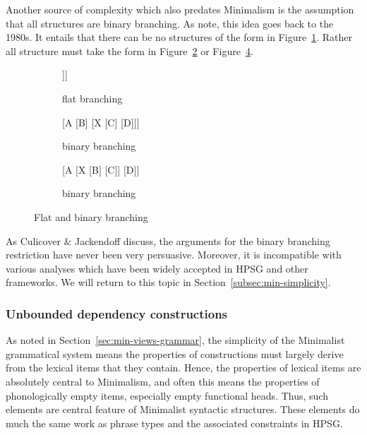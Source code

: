 \documentclass[output=paper
                ,modfonts
                ,nonflat
	        ,collection
	        ,collectionchapter
	        ,collectiontoclongg
 	        ,biblatex
                ,babelshorthands
                ,newtxmath
                ,draftmode
                ,colorlinks, citecolor=brown
]{./langsci/langscibook}
\begin{document}
Another source of complexity which also predates Minimalism is the assumption that
all structures are binary branching. As  \citet[112--116]{CJ2005a} note, this idea goes back to the
1980s. It entails that there can be no structures of the form in
Figure~\ref{fig:min-trinary}. Rather all structure must take the form in
Figure~\ref{fig:min-binary-a} or Figure~\ref{fig:min-binary-b}.
\begin{figure}
\hfill
\begin{subfigure}[t]{0.3\textwidth}
\centering
	\begin{forest} %
		[A
		[B][C][D [\vphantom{E},no edge]]]
	\end{forest}
\vfill
	\caption{\label{fig:min-trinary}flat branching}
\end{subfigure}
\hfill
\begin{subfigure}[t]{0.3\textwidth}
\centering
	\begin{forest} %
		[A
		  [B]
		  [X 
                    [C] 
                    [D]]]
	\end{forest}
	\caption{\label{fig:min-binary-a}binary branching}
\end{subfigure}
\hfill
\begin{subfigure}[t]{0.3\textwidth}
\centering
	\begin{forest} %
		[A
		  [X 
                    [B]
                    [C]]
		  [D]]
	\end{forest}
	\caption{\label{fig:min-binary-b}binary branching}
\end{subfigure}
\hfill\mbox{}
\caption{Flat and binary branching}
\end{figure}
%
As Culicover \& Jackendoff discuss, the arguments for the binary branching restriction have never
been very persuasive. Moreover, it is incompatible with various analyses which have been widely
accepted in HPSG and other frameworks. We will return to this topic in
Section~\ref{subsec:min-simplicity}. 


\subsubsection{Unbounded dependency constructions}
\label{minimalism-sec-empty-elements-for-relative-clauses}

As noted in Section~\ref{sec:min-views-grammar}, the simplicity of the Minimalist grammatical system
means the properties of constructions must largely derive from the lexical items that they
contain. Hence, the properties of lexical items are absolutely central to Minimalism, and often this
means the properties of phonologically empty items, especially empty functional heads. Thus, such elements are central feature of Minimalist syntactic structures. These elements do much the same work as
phrase types and the associated constraints in HPSG. 
\end{document}

